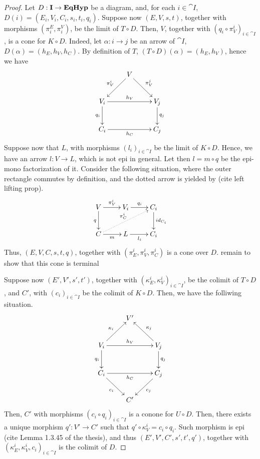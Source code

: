 \begin{proof}
	Let $D: \mathbf{I}\to \textbf{\textup{EqHyp}}$ be a diagram, and, for each $i \in \cat{I}$, $D(i) = (E_i, V_i, C_i, s_i, t_i, q_i)$.
	Suppose now $(E, V, s, t)$, together with morphisms $(\pi_i^E, \pi_i^V)$, be the limit of $T \circ D$.
	Then, $V$, together with $(q_i\circ \pi_V^i)_{i\in \cat I}$, is a cone for $K \circ D$. Indeed, let $\alpha: i \to j$ be an arrow of $\cat I$, $D(\alpha) = (h_E,h_V, h_C)$.
	By definition of $T$, $(T \circ D)(\alpha) = (h_E, h_V)$, hence we have
	\[\xymatrix{
		& V \ar[dl]_{\pi_V^i} \ar[dr]^{\pi_V^j} & \\V_i\ar[rr]^{h_V}\ar[d]_{q_i}&&V_j\ar[d]^{q_j}\\C_i\ar[rr]_{h_C}&&C_j
	}\]
	Suppose now that $L$, with morphisms $(l_i)_{i\in \cat I}$ be the limit of $K\circ D$. Hence, we have an arrow $l:V \to L$, which is not epi in general.
	Let then $l = m \circ q$ be the epi-mono factorization of it. Consider the following situation, where the outer rectangle commutes by definition, and the dotted arrow is yielded by ({\color{red}cite left lifting prop}).
	\[\xymatrix{
			V\ar[r]^{\pi_V^i}\ar[d]_{q}&V_i\ar[r]^{q_i}&C_i\ar[d]^{\id{C_i}}\\C\ar[r]_{m}\ar@{.>}[urr]^{\pi_C^i}&L\ar[r]_{l_i}&{C_i}
	}\]
	Thus, $(E, V, C, s, t, q)$, together with $(\pi_E^i, \pi_V^i, \pi_C^i)$ is a cone over $D$. {\color{red} remain to show that this cone is terminal}
	
	Suppose now $(E', V', s', t')$, together with $(\kappa_E^i, \kappa_V^i)_{i \in \cat I}$, be the colimit of $T \circ D$, and $C'$, with $(c_i)_{i \in \cat I}$ be the colimit of $K \circ D$.
	Then, we have the folliwing situation.
	\[\xymatrix{
								  &  {V'} &                             \\
		V_i \ar[ur]^{\kappa_i} \ar[rr]^{h_V} \ar[d]_{q_i} && V_j \ar[ul]_{\kappa_j} \ar[d]^{q_j}\\
		C_i \ar[dr]_{c_i}      \ar[rr]_{h_C}              &&C_j  \ar[dl]^{c_j}                  \\
								  &  {C'} &
	}\]
	Then, $C'$ with morphisms $(c_i \circ q_i)_{i\in \cat I}$ is a conone for $U \circ D$. Then, there exists a unique morphism $q': V' \to C'$ such that $q'\circ \kappa_V^i = c_i\circ q_i$.
	Such morphism is epi ({\color{red}cite Lemma 1.3.45 of the thesis}), and thus $(E', V', C', s', t', q')$, together with $(\kappa_E^i, \kappa_V^i, c_i)_{i\in \cat I}$ is the colimit of $D$.
	
\end{proof}

